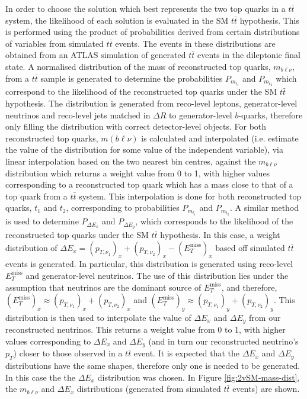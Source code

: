 \begin{figure}[h!]
\end{figure}In order to choose the solution which best represents the two top quarks in a $t\bar{t}$ system, the likelihood of each solution is evaluated in the SM $t\bar{t}$ hypothesis. This is performed using the product of probabilities derived from certain distributions of variables from simulated $t\bar{t}$ events. The events in these distributions are obtained from an ATLAS simulation of generated $t\bar{t}$ events in the dileptonic final state. A normalised distribution of the mass of reconstructed top quarks, $m_{b\ell\nu}$, from a $t\bar{t}$ sample is generated to determine the probabilities $P_{m_{t_{1}}}$ and $P_{m_{t_{2}}}$ which correspond to the likelihood of the reconstructed top quarks under the SM $t\bar{t}$ hypothesis. The distribution is generated from reco-level leptons, generator-level neutrinos and reco-level jets matched in $\Delta R$ to generator-level $b$-quarks, therefore only filling the distribution with correct detector-level objects. For both reconstructed top quarks, $m(b\ell\nu)$ is calculated and interpolated (i.e. estimate the value of the distribution for some value of the independent variable), via linear interpolation based on the two nearest bin centres, against the $m_{b\ell\nu}$ distribution which returns a weight value from 0 to 1, with higher values corresponding to a reconstructed top quark which has a mass close to that of a top quark from a $t\bar{t}$ system. This interpolation is done for both reconstructed top quarks, $t_{1}$ and $t_{2}$, corresponding to probabilities $P_{m_{t_{1}}}$ and $P_{m_{t_{2}}}$. A similar method is used to determine $P_{\Delta E_{x}}$ and $P_{\Delta E_{y}}$, which corresponds to the likelihood of the reconstructed top quarks under the SM $t\bar{t}$ hypothesis. In this case, a weight distribution of $\Delta E_{x} = (p_{T,\nu_{1}})_{x} + (p_{T,\nu_{2}})_{x} - (E_{T}^{\text{miss}})_{x}$ based off simulated $t\bar{t}$ events is generated. In particular, this distribution is generated using reco-level $E_{T}^{\text{miss}}$ and generator-level neutrinos. The use of this distribution lies under the assumption that neutrinos are the dominant source of $E_{T}^{\text{miss}}$, and therefore, $(E_{T}^{\text{miss}})_{x} \approx (p_{T,\nu_{1}})_{x} + (p_{T,\nu_{2}})_{x}$ and $(E_{T}^{\text{miss}})_{y} \approx (p_{T,\nu_{1}})_{y} + (p_{T,\nu_{2}})_{y}$. This distribution is then used to interpolate the value of $\Delta E_{x}$ and $\Delta E_{y}$ from our reconstructed neutrinos. This returns a weight value from 0 to 1, with higher values corresponding to $\Delta E_{x}$ and $\Delta E_{y}$ (and in turn our reconstructed neutrino's $p_{T}$) closer to those observed in a $t\bar{t}$ event. It is expected that the $\Delta E_{x}$ and $\Delta E_{y}$ distributions have the same shapes, therefore only one is needed to be generated. In this case the the $\Delta E_{x}$ distribution was chosen. In Figure \ref{fig:2vSM-mass-dist}, the $m_{b\ell\nu}$ and $\Delta E_{x}$ distributions (generated from simulated $t\bar{t}$ events)  are shown.

